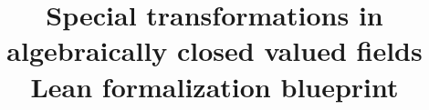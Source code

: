 \theoremstyle{definition}
\newtheorem{theorem}{Theorem}
\newtheorem{definition}[theorem]{Definition}
\newtheorem{lemma}[theorem]{Lemma}
\newtheorem{proposition}[theorem]{Proposition}
\newtheorem{corollary}[theorem]{Corollary}
\newtheorem{remark}[theorem]{Remark}
\newtheorem{assumption}[theorem]{External hypothesis}
\newtheorem{checkedimport}[theorem]{Checked Lean import}

\newcommand{\rv}{\operatorname{rv}}
\newcommand{\repoFile}[2]{\href{https://github.com/daviddhilbert/special-transformations/blob/v1.2/#1}{#2}}

\title{Special transformations in algebraically closed valued fields\\
  \large Lean formalization blueprint}
\author{}
\date{}
